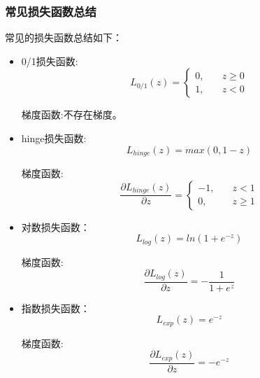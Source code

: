 \documentclass[withoutpreface,bwprint]{NoteBook}
\begin{document}
\subsubsection{常见损失函数总结}
常见的损失函数总结如下：
\begin{itemize}
    
    \item 0/1损失函数:
    \begin{equation}
        \label{eq:0/1损失函数}
        L_{0/1}(z) = 
        \begin{cases}
            0, & \quad z \geq 0 \\
            1, & \quad z < 0
        \end{cases}
    \end{equation}

    梯度函数:不存在梯度。

    \item hinge损失函数:
    \begin{equation}
        \label{eq:hinge损失函数}
        L_{hinge}(z) = max(0, 1 - z)
    \end{equation}

    梯度函数:
    \begin{equation}
        \label{eq:hinge损失函数的梯度函数}
        \frac{\partial L_{hinge}(z)}{\partial z} = 
        \begin{cases}
            -1, & \quad z < 1 \\
            0, & \quad z \geq 1
        \end{cases}
    \end{equation}

    \item 对数损失函数：
    \begin{equation}
        \label{eq:对数损失函数}
        L_{log}(z) = ln(1 + e^{-z})
    \end{equation}

    梯度函数:
    \begin{equation}
        \label{eq:对数损失函数的梯度函数}
        \frac{\partial L_{log}(z)}{\partial z} = 
        -\frac{1}{1+e^{z}}
    \end{equation}

    \item 指数损失函数：
    \begin{equation}
        \label{eq:指数损失函数}
        L_{exp}(z) = e^{-z}
    \end{equation}

    梯度函数:
    \begin{equation}
        \label{eq:指数损失函数的梯度函数}
        \frac{\partial L_{exp}(z)}{\partial z} =
        -e^{-z}
    \end{equation}

\end{itemize}
\end{document}
